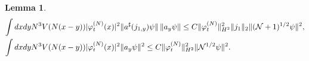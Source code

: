 \documentclass[11pt,a4paper]{article}
\newtheorem{lemma}[thm]{Lemma}
\newcommand{\cN}{{\cal N}}
\begin{document}
\begin{lemma}
\begin{equation}
\begin{split}
 \int dx dy N^3 V(N (x-y))& |\varphi_t^{(N)} (x)|^2  \| a^\sharp (j_{1,y}) \psi \| \, \| a_y \psi \| \leq C\| \varphi_t^{(N)} \|_{H^2}^2 \| j_1 \|_2 \| (\cN+1)^{1/2} \psi \|^2, \\
\int dx dy N^3 V(N (x-y)) &|\varphi_t^{(N)} (x)|^2 \| a_y \psi \|^2 \leq C \| \varphi_t^{(N)} \|_{H^2}^2 \| \cN^{1/2} \psi \|^2.
\end{split} \end{equation}
\end{lemma}
\end{document}
